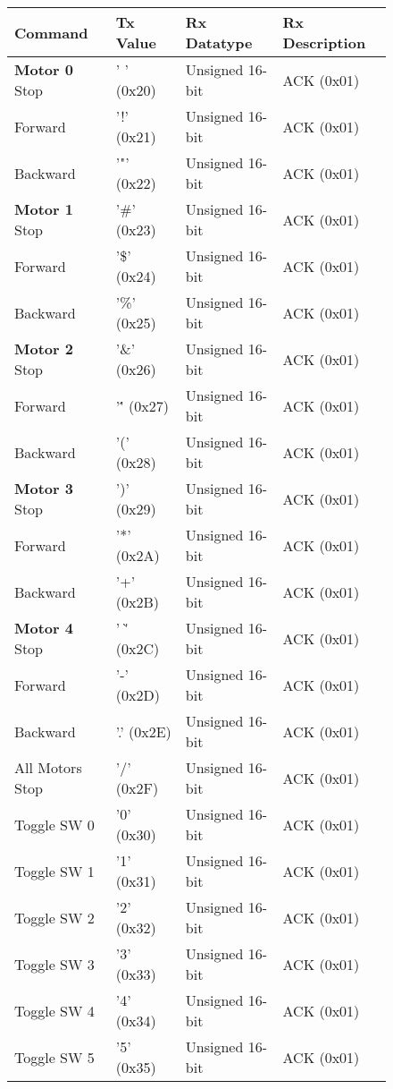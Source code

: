 \documentclass{article}
\begin{document}
\begin{figure}[!h]
\begin{center}
\begin{tabular}{l|l|ll}
\textbf{Command} &
\textbf{Tx Value} &
\textbf{Rx Datatype} &
\textbf{Rx Description}\\
\hline
\textbf{Motor 0} Stop & ' ' (0x20) & Unsigned 16-bit & ACK (0x01) \\ 
Forward & '!' (0x21) & Unsigned 16-bit & ACK (0x01) \\ 
Backward & '"' (0x22) & Unsigned 16-bit & ACK (0x01) \\ 
\hline
\textbf{Motor 1} Stop & '\#' (0x23) & Unsigned 16-bit & ACK (0x01) \\ 
Forward & '\$' (0x24) & Unsigned 16-bit & ACK (0x01) \\ 
Backward & '\%' (0x25) & Unsigned 16-bit & ACK (0x01) \\ 
\hline
\textbf{Motor 2} Stop & '\&' (0x26) & Unsigned 16-bit & ACK (0x01) \\ 
Forward & '\'' (0x27) & Unsigned 16-bit & ACK (0x01) \\ 
Backward & '(' (0x28) & Unsigned 16-bit & ACK (0x01) \\ 
\hline
\textbf{Motor 3} Stop & ')' (0x29) & Unsigned 16-bit & ACK (0x01) \\ 
Forward & '*' (0x2A) & Unsigned 16-bit & ACK (0x01) \\ 
Backward & '+' (0x2B) & Unsigned 16-bit & ACK (0x01) \\ 
\hline
\textbf{Motor 4} Stop & ' \`' (0x2C) & Unsigned 16-bit & ACK (0x01) \\ 
Forward & '-' (0x2D) & Unsigned 16-bit & ACK (0x01) \\ 
Backward & '.' (0x2E) & Unsigned 16-bit & ACK (0x01) \\ 
\hline
All Motors Stop & '/' (0x2F) & Unsigned 16-bit & ACK (0x01) \\ 
\hline
Toggle SW 0 & '0' (0x30) & Unsigned 16-bit & ACK (0x01) \\ 
Toggle SW 1 & '1' (0x31) & Unsigned 16-bit & ACK (0x01) \\ 
Toggle SW 2 & '2' (0x32) & Unsigned 16-bit & ACK (0x01) \\ 
Toggle SW 3 & '3' (0x33) & Unsigned 16-bit & ACK (0x01) \\ 
Toggle SW 4 & '4' (0x34) & Unsigned 16-bit & ACK (0x01) \\ 
Toggle SW 5 & '5' (0x35) & Unsigned 16-bit & ACK (0x01) \\ 

\end{tabular}
\end{center}
\end{figure}
\end{document}
